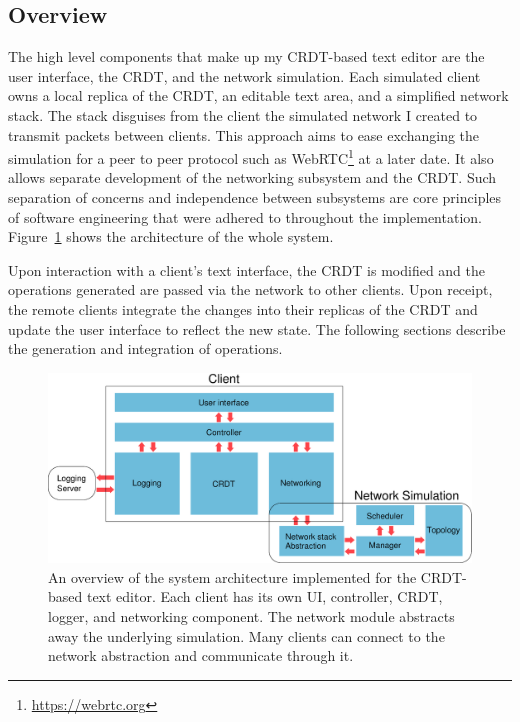 \documentclass[12pt,a4paper,twoside,openright]{report}
\begin{document}
	\subsection{Overview}
	The high level components that make up my CRDT-based text editor are the user interface, the CRDT, and the network simulation. Each simulated client owns a local replica of the CRDT, an editable text area, and a simplified network stack. The stack disguises from the client the simulated network I created to transmit packets between clients. This approach aims to ease exchanging the simulation for a peer to peer protocol such as WebRTC\footnote{\url{https://webrtc.org}} at a later date. It also allows separate development of the networking subsystem and the CRDT. Such separation of concerns and independence between subsystems are core principles of software engineering that were adhered to throughout the implementation. Figure~\ref{fig:sysarch} shows the architecture of the whole system. 
	
	Upon interaction with a client's text interface, the CRDT is modified and the operations generated are passed via the network to other clients. Upon receipt, the remote clients integrate the changes into their replicas of the CRDT and update the user interface to reflect the new state. The following sections describe the generation and integration of operations.
	
	\begin{figure}[H]
		\centering
		\includegraphics[width=1\linewidth]{figs/sysarch.eps}
		\caption[System Architecture]{An overview of the system architecture implemented for the CRDT-based text editor. Each client has its own UI, controller, CRDT, logger, and networking component. The network module abstracts away the underlying simulation. Many clients can connect to the network abstraction and communicate through it.}
		\label{fig:sysarch}
	\end{figure}
	
\end{document}
